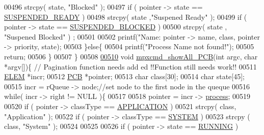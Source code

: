 \begin{DoxyCode}
00496                         strcpy( state, \textcolor{stringliteral}{"Blocked"} );
00497                 \textcolor{keywordflow}{if} ( pointer -> state == \hyperlink{mpx__r2_8h_a07b1141143e8825b04670da23fca8cc7}{SUSPENDED_READY} ) 
00498                         strcpy( state ,\textcolor{stringliteral}{"Suspened Ready"} );
00499                 \textcolor{keywordflow}{if} ( pointer -> state == \hyperlink{mpx__r2_8h_a6e41bb5a80c5049e8d364bab8ee4d73a}{SUSPENDED_BLOCKED} ) 
00500                         strcpy( state , \textcolor{stringliteral}{"Suspened Blocked"} ) ;
00501                 
00502                 printf(\textcolor{stringliteral}{"Name: %
      pointer -> name, \textcolor{keyword}{class}, pointer -> priority, state); 
00503         \}\textcolor{keywordflow}{else}\{
00504                 printf(\textcolor{stringliteral}{"Process Name not found!"});
00505                 \textcolor{keywordflow}{return};
00506         \}
00507 \}
00508 
\hypertarget{mpx__r2_8c_source_l00510}{}\hyperlink{mpx__r2_8h_a69559f93fe1b569abf6e846a426191a9}{00510} \textcolor{keywordtype}{void} \hyperlink{mpx__r2_8c_a69559f93fe1b569abf6e846a426191a9}{mpxcmd_showAll_PCB}(\textcolor{keywordtype}{int} argc, \textcolor{keywordtype}{char} *argv[])\{ \textcolor{comment}{// Pagination function needs add
      ed !!Function still needs work!!}
00511         \hyperlink{structpage}{ELEM} *incr;
00512         \hyperlink{structprocess}{PCB} *pointer;
00513         \textcolor{keywordtype}{char} \textcolor{keyword}{class}[30];
00514         \textcolor{keywordtype}{char} state[45];
00515         incr = rQueue -> node;\textcolor{comment}{//set node to the first node in the queque}
00516         \textcolor{keywordflow}{while}( incr -> right != NULL )\{
00517                 
00518                 pointer = incr -> \hyperlink{structprocess}{process};
00519                 
00520                 \textcolor{keywordflow}{if} ( pointer -> classType  == \hyperlink{mpx__r2_8h_a796bd7c6ba2e59281760fb155c6287e8}{APPLICATION} )
00521                         strcpy( \textcolor{keyword}{class}, \textcolor{stringliteral}{"Application"} );
00522                 \textcolor{keywordflow}{if} (  pointer -> classType == \hyperlink{mpx__r2_8h_a21b97df85e65556468b28a576311271c}{SYSTEM} )
00523                         strcpy ( \textcolor{keyword}{class}, \textcolor{stringliteral}{"System"} );
00524                 
00525                 
00526                 \textcolor{keywordflow}{if} ( pointer -> state == \hyperlink{mpx__r2_8h_a6fb7181d994ee98e735494be55809708}{RUNNING} ) 
}
\end{DoxyCode}
